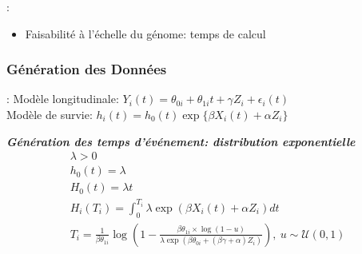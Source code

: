 \documentclass[10pt,  xcolors={RGB}, hyperref={%
    pdfpagelabels=false,
    colorlinks=true,
    pdftex=true,
    bookmarks=true,
    bookmarksopen=true,
    hyperfootnotes=true}]{beamer}
\begin{document}
\begin{frame}{\subsecname: \subsubsecname}
{\begin{itemize}
\begin{center}
\begin{minipage}[t]{0.85\textwidth}
\begin{block}{\itshape\textbf{Root-Mean Square Error}}
\begin{align}
                    		\operatorname{RMSE}(\hat{\theta})&=\sqrt{\operatorname{MSE}(\hat\theta)}\nonumber\\
                    		&=\sqrt{E\{(\hat{\theta}-\theta)^2\}}\nonumber
                	\end{align}
                \end{block}\vspace{1.5em}\end{minipage}\end{center}
            \item Faisabilité à l'échelle du génome: temps de calcul
        \end{itemize}
    }
\end{frame}


\subsubsection{Génération des Données}
\begin{frame}{\subsecname: \subsubsecname}
    Modèle longitudinale: $Y_{i}(t)=\theta_{0i} + \theta_{1i}t + \gamma Z_i + \epsilon_{i}(t)$\\
    Modèle de survie: $h_i(t)=h_0(t) \exp\{\beta X_{i}(t) + \alpha Z_i\}$
    \begin{center}\begin{minipage}[t]{0.85\textwidth}\vspace{-1.5em}\begin{block}{\itshape\textbf{Génération des temps d'événement: distribution exponentielle}}\vspace{-1em}\begin{gather*}
        \lambda>0\nonumber\\
        h_0(t)=\lambda\nonumber\\
        H_0(t)=\lambda t\nonumber\\
        H_i(T_i)=\int_0^{T_i}\lambda \exp(\beta X_i(t)+\alpha Z_i)dt\nonumber\\
        T_i=\frac{1}{\beta\theta_{1i}}\log\left(1-\frac{\beta\theta_{1i}\times \log(1-u)}{\lambda \exp(\beta\theta_{0i}+(\beta\gamma+\alpha)Z_i)}\right)\nonumber,\ u\sim\mathcal{U}(0,1)\nonumber\\
    \end{gather*}\end{block}\vspace{1.5em}\end{minipage}\end{center}
\end{frame}
\end{document}
